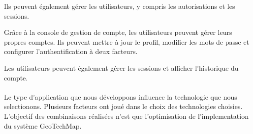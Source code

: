         Ils peuvent également gérer les utilisateurs, y compris les autorisations et les sessions.   
        \par 
        Grâce à la console de gestion de compte, les utilisateurs peuvent gérer leurs propres comptes. Ils peuvent mettre à jour le profil, modifier les mots de passe et configurer l'authentification à deux facteurs.

        Les utilisateurs peuvent également gérer les sessions et afficher l'historique du compte.   
        \paragraph{}
        Le type d'application que nous développons influence la technologie que nous selectionons.
        Plusieurs facteurs ont joué dans le choix des technologies choisies. L'objectif des combinaisons
        réalisées n'est que l'optimisation de l'implementation du système GeoTechMap.